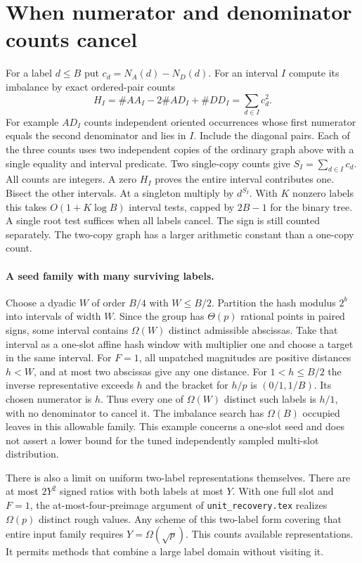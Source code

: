 \documentclass[11pt]{article}
\begin{document}
\section{When numerator and denominator counts cancel}
For a label $d\le B$ put $c_d=N_A(d)-N_D(d)$. For an interval $I$
compute its imbalance by exact ordered-pair counts
\[
  H_I=\#AA_I-2\#AD_I+\#DD_I=\sum_{d\in I}c_d^2 .
\]
For example $AD_I$ counts independent oriented occurrences whose
first numerator equals the second denominator and lies in $I$.
Include the diagonal pairs. Each of the three counts uses two
independent copies of the ordinary graph above with a single equality
and interval predicate. Two single-copy counts give
$S_I=\sum_{d\in I}c_d$. All counts are integers. A zero $H_I$ proves
the entire interval contributes one. Bisect the other intervals.
At a singleton multiply by $d^{S_I}$. With $K$ nonzero labels this
takes $O(1+K\log B)$ interval tests, capped by $2B-1$ for the binary
tree. A single root test suffices when all labels cancel. The sign
is still counted separately. The two-copy graph has a larger
arithmetic constant than a one-copy count.

\paragraph{A seed family with many surviving labels.}
Choose a dyadic $W$ of order $B/4$ with $W\le B/2$. Partition the
hash modulus $2^b$ into intervals of width $W$. Since the group has
$\Theta(p)$ rational points in paired signs, some interval contains
$\Omega(W)$ distinct admissible abscissas. Take that interval as a
one-slot affine hash window with multiplier one and choose a target
in the same interval. For $F=1$, all unpatched magnitudes are positive
distances $h<W$, and at most two abscissas give any one distance.
For $1<h\le B/2$ the inverse representative exceeds $h$ and the
bracket for $h/p$ is $(0/1,1/B)$. Its chosen numerator is $h$.
Thus every one of $\Omega(W)$ distinct such labels is $h/1$, with
no denominator to cancel it. The imbalance search has $\Omega(B)$
occupied leaves in this allowable family. This example concerns a
one-slot seed and does not assert a lower bound for the tuned
independently sampled multi-slot distribution.

There is also a limit on uniform two-label representations themselves.
There are at most $2Y^2$ signed ratios with both labels at most $Y$.
With one full slot and $F=1$, the at-most-four-preimage argument of
\texttt{unit\_recovery.tex} realizes $\Omega(p)$ distinct rough values.
Any scheme of this two-label form covering that entire input family
requires $Y=\Omega(\sqrt p)$. This counts available representations.
It permits methods that combine a large label domain without visiting it.
\end{document}
